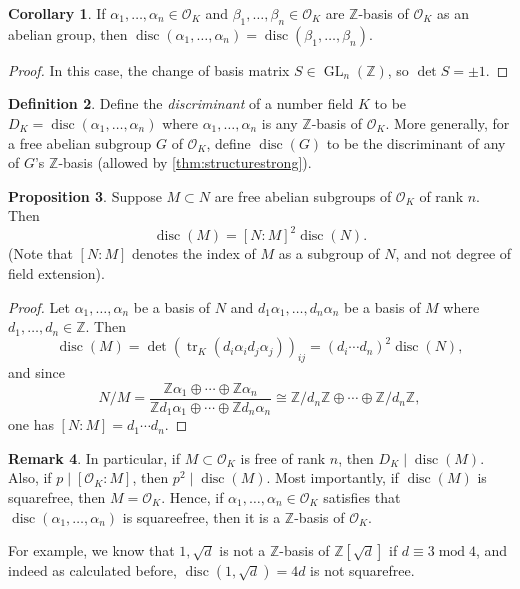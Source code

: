 \documentclass{article}
\newcommand{\Z}{\mathbb{Z}}
\newcommand{\tr}{\operatorname{tr}}
\newcommand{\Mod}{\operatorname{mod}}
\newcommand{\GL}{\operatorname{GL}}
\newcommand{\disc}{\operatorname{disc}}
\newcommand{\ri}{\mathcal{O}}
\theoremstyle{definition}
\newtheorem{defn}{Definition}[subsection]
\newtheorem{prop}[defn]{Proposition}
\newtheorem{coro}[defn]{Corollary}
\newtheorem{remark}[defn]{Remark}
\begin{document}
\begin{coro}
\label{coro:diffbassamedisc}
If $\alpha_1,\ldots,\alpha_n\in\ri_K$ and $\beta_1,\ldots,\beta_n\in\ri_K$ are $\Z$-basis of $\ri_K$ as an abelian group, then $\disc(\alpha_1,\ldots,\alpha_n)=\disc(\beta_1,\ldots,\beta_n)$.
\end{coro}
\begin{proof}
In this case, the change of basis matrix $S\in\GL_n(\Z)$, so $\det S=\pm 1$.
\end{proof}

\begin{defn}
Define the \textit{discriminant} of a number field $K$ to be $D_K=\disc(\alpha_1,\ldots,\alpha_n)$ where $\alpha_1,\ldots,\alpha_n$ is any $\Z$-basis of $\ri_K$. More generally, for a free abelian subgroup $G$ of $\ri_K$, define $\disc(G)$ to be the discriminant of any of $G$'s $\Z$-basis (allowed by \ref{thm:structurestrong}).
\end{defn}

\begin{prop}
\label{prop:discratioofsbgrp}
Suppose $M\subset N$ are free abelian subgroups of $\ri_K$ of rank $n$. Then
\[
\disc(M)=[N:M]^2\disc(N).
\]
(Note that $[N:M]$ denotes the index of $M$ as a subgroup of $N$, and not degree of field extension).
\end{prop}
\begin{proof}
Let $\alpha_1,\ldots,\alpha_n$ be a basis of $N$ and $d_1\alpha_1,\ldots,d_n\alpha_n$ be a basis of $M$ where $d_1,\ldots,d_n\in\Z$. Then
\[
\disc(M)=\det (\tr_K(d_i\alpha_i d_j\alpha_j))_{ij}=(d_i\cdots d_n)^2\disc (N),
\]
and since
\[
N/M=\frac{\Z\alpha_1\oplus\cdots\oplus\Z\alpha_n}{\Z d_1\alpha_1\oplus\cdots\oplus\Z d_n\alpha_n}\cong \Z/d_n\Z\oplus\cdots\oplus\Z/d_n\Z,
\]
one has $[N:M]=d_1\cdots d_n$.
\end{proof}

\begin{remark}
In particular, if $M\subset\ri_K$ is free of rank $n$, then $D_K\mid\disc(M)$. Also, if $p\mid [\ri_K:M]$, then $p^2\mid\disc(M)$. Most importantly, if $\disc(M)$ is squarefree, then $M=\ri_K$. Hence, if $\alpha_1,\ldots,\alpha_n\in\ri_K$ satisfies that $\disc(\alpha_1,\ldots,\alpha_n)$ is squareefree, then it is a $\Z$-basis of $\ri_K$.

For example, we know that $1,\sqrt d$ is not a $\Z$-basis of $\Z\left[\sqrt d\right]$ if $d\equiv 3\Mod 4$, and indeed as calculated before, $\disc\left(1,\sqrt d\right)=4d$ is not squarefree.
\end{remark}
\end{document}

